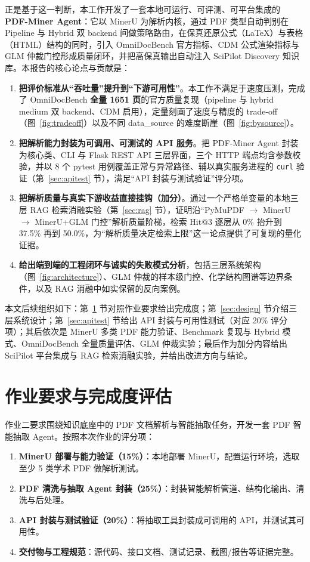 \documentclass[UTF8,a4paper,11pt]{ctexart}
\begin{document}
正是基于这一判断，本工作开发了一套本地可运行、可评测、可平台集成的 \textbf{PDF-Miner Agent}：它以 MinerU 为解析内核，通过 PDF 类型自动判别在 Pipeline 与 Hybrid 双 backend 间做策略路由，在保真还原公式（LaTeX）与表格（HTML）结构的同时，引入 OmniDocBench 官方指标、CDM 公式渲染指标与 GLM 仲裁门控形成质量闭环，并把高保真输出自动注入 SciPilot Discovery 知识库。本报告的核心论点与贡献是：

\begin{enumerate}
  \item \textbf{把评价标准从“吞吐量”提升到“下游可用性”}。本工作不满足于速度压测，完成了 OmniDocBench \textbf{全量 1651 页}的官方质量复现（pipeline 与 hybrid medium 双 backend、CDM 启用），定量刻画了速度与精度的 trade-off（图~\ref{fig:tradeoff}）以及不同 data\_source 的难度断崖（图~\ref{fig:bysource}）。
  \item \textbf{把解析能力封装为可调用、可测试的 API 服务}。把 PDF-Miner Agent 封装为核心类、CLI 与 Flask REST API 三层界面，三个 HTTP 端点均含参数校验，并以 8 个 pytest 用例覆盖正常与异常路径、辅以真实服务进程的 \texttt{curl} 验证（第~\ref{sec:apitest} 节），满足``API 封装与测试验证''评分项。
  \item \textbf{把解析质量与真实下游收益直接挂钩（加分）}。通过一个严格单变量的本地三层 RAG 检索消融实验（第~\ref{sec:rag} 节），证明沿``PyMuPDF $\to$ MinerU $\to$ MinerU+GLM 门控''解析质量阶梯，检索 Hit@3 逐层从 0\% 抬升到 37.5\% 再到 50.0\%，为``解析质量决定检索上限''这一论点提供了可复现的量化证据。
  \item \textbf{给出端到端的工程闭环与诚实的失败模式分析}，包括三层系统架构（图~\ref{fig:architecture}）、GLM 仲裁的样本级门控、化学结构图谱等边界条件，以及 RAG 消融中如实保留的反向案例。
\end{enumerate}

本文后续组织如下：第~\ref{sec:coverage} 节对照作业要求给出完成度；第~\ref{sec:design} 节介绍三层系统设计；第~\ref{sec:apitest} 节给出 API 封装与可用性测试（对应 20\% 评分项）；其后依次是 MinerU 多类 PDF 能力验证、Benchmark 复现与 Hybrid 模式、OmniDocBench 全量质量评估、GLM 仲裁实验；最后作为加分内容给出 SciPilot 平台集成与 RAG 检索消融实验，并给出改进方向与结论。

\section{作业要求与完成度评估}
\label{sec:coverage}

作业二要求围绕知识底座中的 PDF 文档解析与智能抽取任务，开发一套 PDF 智能抽取 Agent。按照本次作业的评分项：
\begin{enumerate}
  \item \textbf{MinerU 部署与能力验证（15\%）}：本地部署 MinerU，配置运行环境，选取至少 5 类学术 PDF 做解析测试。
  \item \textbf{PDF 清洗与抽取 Agent 封装（25\%）}：封装智能解析管道、结构化输出、清洗与后处理。
  \item \textbf{API 封装与测试验证（20\%）}：将抽取工具封装成可调用的 API，并测试其可用性。
  \item \textbf{交付物与工程规范}：源代码、接口文档、测试记录、截图/报告等证据完整。
\end{enumerate}
\end{document}
